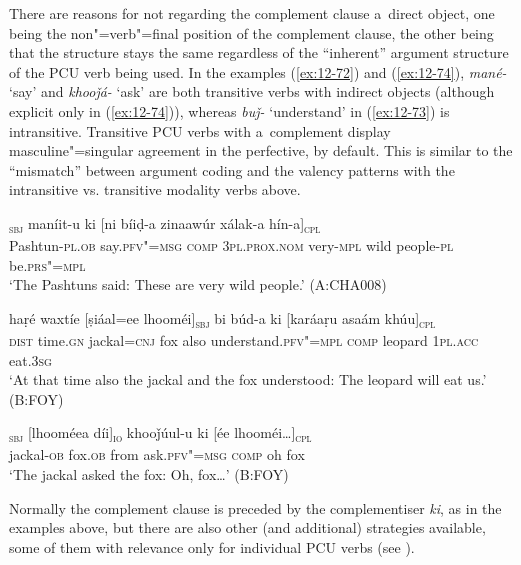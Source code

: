 There are reasons for not regarding the complement clause a~direct object, one being the non"=verb"=final position of the complement clause, the other being that the structure stays the same regardless of the ``inherent'' argument structure of the PCU verb being used. In the examples (\ref{ex:12-72}) and (\ref{ex:12-74}), \textit{mané-} `say' and \textit{khooǰá-} `ask' are both transitive verbs with indirect objects (although explicit only in (\ref{ex:12-74})), whereas \textit{buǰ-} `understand' in (\ref{ex:12-73}) is intransitive. Transitive PCU verbs with a~complement display masculine"=singular agreement in the perfective, by default. This is similar to the ``mismatch'' between argument coding and the valency patterns with the intransitive vs. transitive modality verbs above.

\begin{exe}
\ex
\label{ex:12-72}
\gll [ɡhueeṇíi-am]\textsubscript{\textsc{sbj}} maníit-u ki [ni bíiḍ-a zinaawúr xálak-a hín-a]\textsubscript{\textsc{cpl}} \\
Pashtun-\textsc{pl.ob} say.\textsc{pfv"=msg} \textsc{c}\textsc{om}\textsc{p} \textsc{3pl.prox.nom} very-\textsc{mpl}  wild people-\textsc{pl} be.\textsc{prs"=mpl} \\
\glt `The Pashtuns said: These are very wild people.' (A:CHA008)
\end{exe}
\begin{exe}
\ex
\label{ex:12-73}
\gll haṛé waxtíe [ṣiáal=ee lhooméi]\textsubscript{\textsc{sbj}} bi búd-a ki \textsc{[}karáaṛu asaám khúu]\textsubscript{\textsc{cpl}} \\
\textsc{dist} time.\textsc{gn} jackal=\textsc{cnj} fox also  understand.\textsc{pfv"=mpl} \textsc{comp} leopard \textsc{1pl.acc} eat.\textsc{3sg} \\
\glt `At that time also the jackal and the fox understood: The leopard will eat us.' (B:FOY)
\end{exe}
\begin{exe}
\ex
\label{ex:12-74}
\gll [ṣiúul-a]\textsubscript{\textsc{sbj}} [lhooméea díi]\textsubscript{\textsc{io}} khooǰúul-u ki [ée lhooméi{\ldots}]\textsubscript{\textsc{cpl}} \\
jackal-\textsc{ob} fox.\textsc{ob} from ask.\textsc{pfv"=msg} \textsc{comp} oh fox \\
\glt `The jackal asked the fox: Oh, fox{\ldots}' (B:FOY)
\end{exe}

Normally the complement clause is preceded by the complementiser \textit{ki}, as in the examples above, but there are also other (and additional) strategies available, some of them with relevance only for individual PCU verbs (see ). 


